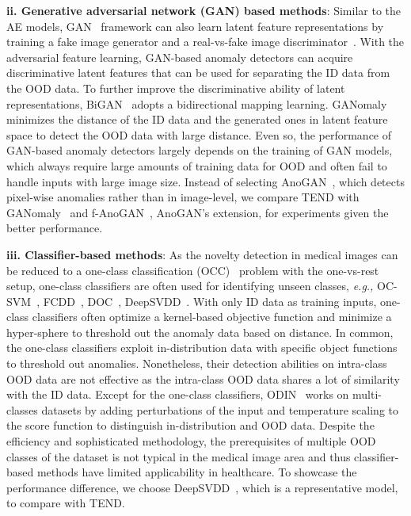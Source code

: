 \documentclass[12pt]{spieman}  %
\begin{document}
\begin{spacing}{2}
\noindent \textbf{ii. Generative adversarial network (GAN) based methods}: Similar to the AE models, GAN~\cite{goodfellow2020generative} framework can also learn latent feature representations by training a fake image generator and a real-vs-fake image discriminator~\cite{zenati2018efficient:zenati,perera2019ocgan:ocgan}. With the adversarial feature learning, GAN-based anomaly detectors can acquire discriminative latent features that can be used for separating the ID data from the OOD data. To further improve the discriminative ability of latent representations, BiGAN~\cite{donahue2016adversarial:donahue} adopts a bidirectional mapping learning. GANomaly~\cite{akcay2018ganomaly:akcay} minimizes the distance of the ID data and the generated ones in latent feature space to detect the OOD data with large distance. 
Even so, the performance of GAN-based anomaly detectors largely depends on the training of GAN models, which always require large amounts of training data for OOD and often fail to handle inputs with large image size. Instead of selecting AnoGAN~\cite{schlegl2017unsupervised:schlegl}, which detects pixel-wise anomalies rather than in image-level, we compare TEND with GANomaly~\cite{akcay2018ganomaly:akcay} and f-AnoGAN~\cite{schlegl2019f}, AnoGAN's extension, for experiments given the better performance.


\noindent \textbf{iii. Classifier-based methods}: As the novelty detection in medical images can be reduced to a one-class classification (OCC)~\cite{khan2014one} problem with the one-vs-rest setup, one-class classifiers are often used for identifying unseen classes, \textit{e.g.,} OC-SVM~\cite{scholkopf2001estimating:ocsvm}, FCDD~\cite{liznerski2020explainable:explainable}, DOC~\cite{perera2019learning:perera}, DeepSVDD~\cite{ruff2018deep:ruff}. With only ID data as training inputs, one-class classifiers often optimize a kernel-based objective function and minimize a hyper-sphere to threshold out the anomaly data based on distance. 
In common, the one-class classifiers exploit in-distribution data with specific object functions to threshold out anomalies. Nonetheless, their detection abilities on intra-class OOD data are not effective as the intra-class OOD data shares a lot of similarity with the ID data. Except for the one-class classifiers, ODIN~\cite{liang2017enhancing:liang} works on multi-classes datasets by adding perturbations of the input and temperature scaling to the score function to distinguish in-distribution and OOD data. Despite the efficiency and sophisticated methodology, the prerequisites of multiple OOD classes of the dataset is not typical in the medical image area and thus classifier-based methods have limited applicability in healthcare. To showcase the performance difference, we choose DeepSVDD~\cite{ruff2018deep:ruff}, which is a representative model, to compare with TEND.


\end{spacing}
\end{document}
